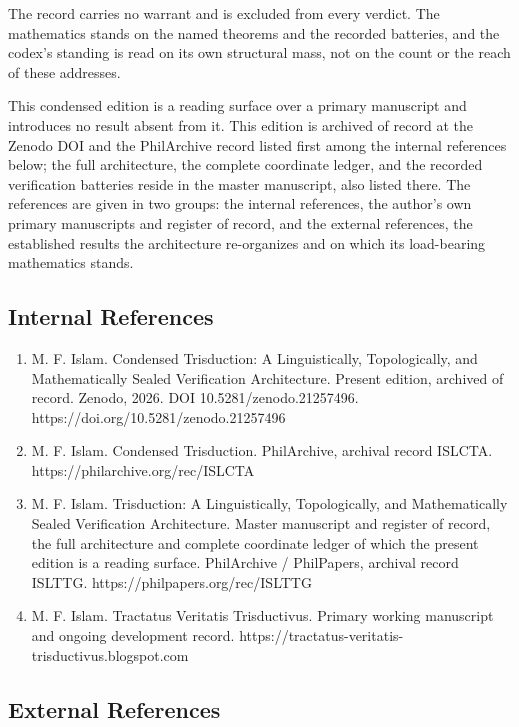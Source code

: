 \documentclass[10pt,twocolumn]{article}
\providecommand{\tightlist}{\setlength{\itemsep}{0pt}\setlength{\parskip}{0pt}}
\begin{document}
The record carries no warrant and is excluded from every verdict. The
mathematics stands on the named theorems and the recorded batteries, and
the codex's standing is read on its own structural mass, not on the
count or the reach of these addresses.

This condensed edition is a reading surface over a primary manuscript
and introduces no result absent from it. This edition is archived of
record at the Zenodo DOI and the PhilArchive record listed first among
the internal references below; the full architecture, the complete
coordinate ledger, and the recorded verification batteries reside in the
master manuscript, also listed there. The references are given in two
groups: the internal references, the author's own primary manuscripts
and register of record, and the external references, the established
results the architecture re-organizes and on which its load-bearing
mathematics stands.

\hypertarget{internal-references}{%
\subsection{Internal References}\label{internal-references}}

\begin{enumerate}
\def\labelenumi{\arabic{enumi}.}
\tightlist
\item
  M. F. Islam. Condensed Trisduction: A Linguistically, Topologically,
  and Mathematically Sealed Verification Architecture. Present edition,
  archived of record. Zenodo, 2026. DOI 10.5281/zenodo.21257496.
  https://doi.org/10.5281/zenodo.21257496
\item
  M. F. Islam. Condensed Trisduction. PhilArchive, archival record
  ISLCTA. https://philarchive.org/rec/ISLCTA
\item
  M. F. Islam. Trisduction: A Linguistically, Topologically, and
  Mathematically Sealed Verification Architecture. Master manuscript and
  register of record, the full architecture and complete coordinate
  ledger of which the present edition is a reading surface. PhilArchive
  / PhilPapers, archival record ISLTTG.
  https://philpapers.org/rec/ISLTTG
\item
  M. F. Islam. Tractatus Veritatis Trisductivus. Primary working
  manuscript and ongoing development record.
  https://tractatus-veritatis-trisductivus.blogspot.com
\end{enumerate}

\hypertarget{external-references}{%
\subsection{External References}\label{external-references}}
\end{document}
